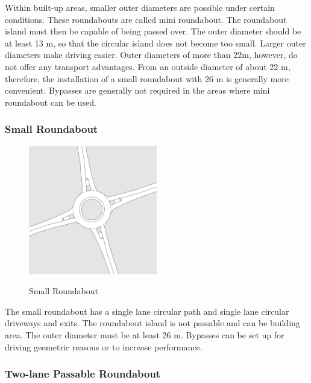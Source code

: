 Within built-up areas, smaller outer diameters are possible under certain conditions.
These roundabouts are called mini roundabout. The roundabout island must then be capable of being passed over.
The outer diameter should be at least 13 m, so that the circular island does not become too small.
Larger outer diameters make driving easier. Outer diameters of more than 22m, however, do not offer any transport advantages.
From an outside diameter of about 22 m, therefore, the installation of a small roundabout with 26 m is generally more convenient.
Bypasses are generally not required in the areas where mini roundabout can be used.


\subsubsection{Small Roundabout}
\label{smal_roundabout}

\begin{figure}[!ht]
\caption{Small Roundabout \cite{man06}}
\includegraphics[width=0.5\textwidth]{bilder/small_roundabout.png} %
\label{roundabout_small}
\end{figure}

The small roundabout has a single lane circular path and single lane circular driveways and exits. The roundabout island is not passable and can be building area.
The outer diameter must be at least 26 m. Bypasses can be set up for driving geometric reasons or to increase performance.


\subsubsection{Two-lane Passable Roundabout}

